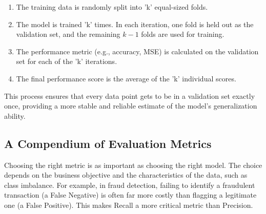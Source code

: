 \documentclass[11pt,a4paper]{article}
\begin{document}
\begin{enumerate}
    \item The training data is randomly split into 'k' equal-sized folds.
    \item The model is trained 'k' times. In each iteration, one fold is held out as the validation set, and the remaining $k-1$ folds are used for training.
    \item The performance metric (e.g., accuracy, MSE) is calculated on the validation set for each of the 'k' iterations.
    \item The final performance score is the average of the 'k' individual scores.
\end{enumerate}

This process ensures that every data point gets to be in a validation set exactly once, providing a more stable and reliable estimate of the model's generalization ability.

\subsection{A Compendium of Evaluation Metrics}

Choosing the right metric is as important as choosing the right model. The choice depends on the business objective and the characteristics of the data, such as class imbalance. For example, in fraud detection, failing to identify a fraudulent transaction (a False Negative) is often far more costly than flagging a legitimate one (a False Positive). This makes Recall a more critical metric than Precision.
\end{document}

